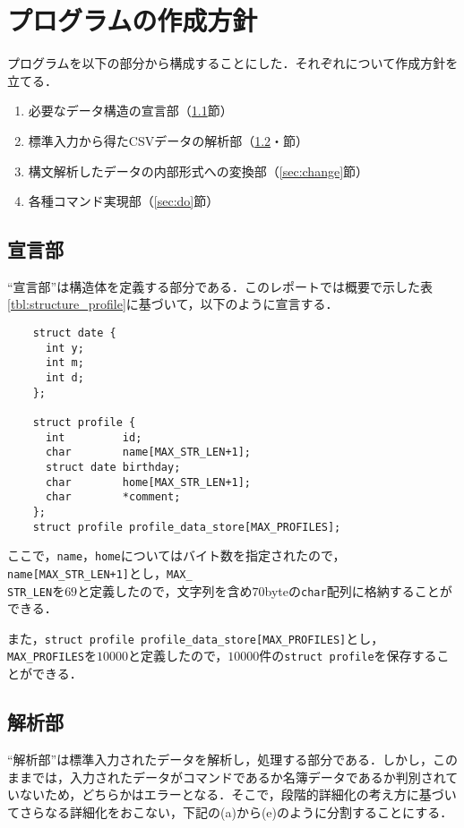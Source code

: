 \documentclass[a4j,11pt]{jarticle}
\begin{document}
\section{プログラムの作成方針}\label{pro:plan}
プログラムを以下の部分から構成することにした．それぞれについて作成方針を立てる．
\begin{enumerate}
\setlength{\parskip}{2pt} \setlength{\itemsep}{2pt}
    \item 必要なデータ構造の宣言部（\ref{sec:declare}節）
    \item 標準入力から得たCSVデータの解析部（\ref{sec:parse}・節）
    \item 構文解析したデータの内部形式への変換部（\ref{sec:change}節）
    \item 各種コマンド実現部（\ref{sec:do}節）
\end{enumerate}

\subsection{宣言部} \label{sec:declare}\setlength
``宣言部''は構造体を定義する部分である．このレポートでは概要で示した表\ref{tbl:structure_profile}に基づいて，以下のように宣言する．
{\fontsize{10pt}{11pt} \selectfont
\begin{verbatim}
    struct date {
      int y;
      int m;
      int d;
    };

    struct profile {
      int         id;
      char        name[MAX_STR_LEN+1];
      struct date birthday;
      char        home[MAX_STR_LEN+1];
      char        *comment;
    };
    struct profile profile_data_store[MAX_PROFILES];
\end{verbatim}
}
ここで，\verb|name|，\verb|home|についてはバイト数を指定されたので，\verb|name[MAX_STR_LEN+1]|とし，\verb|MAX_|\\\verb|STR_LEN|を$69$と定義したので，文字列を含め$70$byteの\verb|char|配列に格納することができる．

また，\verb|struct profile profile_data_store[MAX_PROFILES]|とし，\verb|MAX_PROFILES|を$10000$と定義したので，$10000$件の\verb|struct profile|を保存することができる．

\subsection{解析部} \label{sec:parse}
``解析部''は標準入力されたデータを解析し，処理する部分である．しかし，このままでは，入力されたデータがコマンドであるか名簿データであるか判別されていないため，どちらかはエラーとなる．そこで，段階的詳細化の考え方に基づいてさらなる詳細化をおこない，下記の(a)から(e)のように分割することにする．
\end{document}
